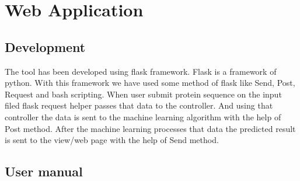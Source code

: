 \chapter{Web Application} \label{Application}

\ifpdf
    \graphicspath{{chapter_7/figures/PNG/}{chapter_7/figures/PDF/}{chapter_7/figures/}}
\else
    \graphicspath{{chapter_7/figures/EPS/}{chapter_7/figures/}}
\fi

\section{Development}

The tool has been developed using flask framework. Flask is a framework of python. With this framework we have used some method of flask like Send, Post, Request and bash scripting. When user submit protein sequence on the input filed flask request helper passes that data to the controller. And using that controller the data is sent to the machine learning algorithm with the help of Post method. After the machine learning processes that data the predicted result is sent to the view/web page with the help of Send method.

\section{User manual}

